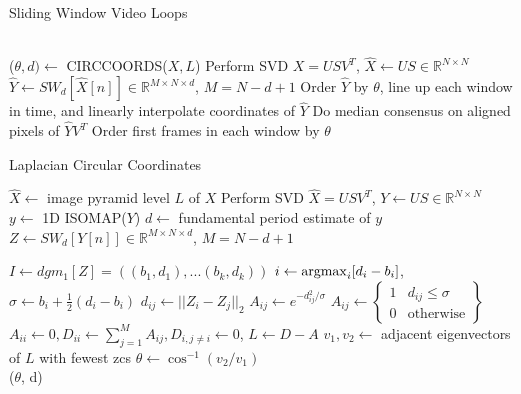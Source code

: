 \documentclass{article}
\newcommand{\argmax}{\operatornamewithlimits{argmax}}
\begin{document}
\begin{algorithm}[t]
  \caption{Sliding Window Video Loops}\label{alg:videoreordering}
  \begin{algorithmic}[1]
     \\
    \State ($\theta, d) \gets$ CIRCCOORDS($X, L$)
    \State Perform SVD $X = USV^T$, $\hat{X} \gets US \in \mathbb{R}^{N \times N}$
    \State $\hat{Y} \gets SW_d[\hat{X}[n]] \in \mathbb{R}^{M \times N \times d}$, $M = N-d+1$
        \State Order $\hat{Y}$ by $\theta$, line up each window in time, and linearly interpolate coordinates of $\hat{Y}$
        \State Do median consensus on aligned pixels of $\hat{Y}V^T$ \label{algline:medianconsensus}
    \Else
        \State Order first frames in each window by $\theta$
    \EndIf
    \EndProcedure
  \end{algorithmic}
\end{algorithm}


\begin{algorithm}[t]
    \caption{Laplacian Circular Coordinates}
    \begin{algorithmic}[1]
    \State $\hat{X} \gets $ image pyramid level $L$ of $X$
    \State Perform SVD $\hat{X} = USV^T$, $Y \gets US \in \mathbb{R}^{N \times N}$
    \State $y \gets$ 1D ISOMAP($Y$) \cite{tenenbaum2000global}
    \State $d \gets$ fundamental period estimate of $y$ \cite{Mcleod05asmarter}
    \State $Z \gets SW_{d}[Y[n]] \in \mathbb{R}^{M \times N \times d}$, $M = N-d+1$

    \State $I \gets dgm_1[Z] = ((b_1, d_1), ... (b_k, d_k))$
    \State $i \gets \argmax_{i}[d_i - b_i]$, $\sigma \gets b_i + \frac{1}{2}(d_i - b_i)$
    \State $d_{ij} \gets ||Z_i - Z_j||_2$
        \State $A_{ij} \gets e^{-d_{ij}^2/\sigma}$
    \Else
        \State $A_{ij} \gets \left\{ \begin{array}{cc} 1 & d_{ij} \leq \sigma \\ 0 & \text{otherwise} \end{array} \right\}$
    \EndIf
    \State $A_{ii} \gets 0, D_{ii} \gets \sum_{j=1}^M A_{ij}, D_{i, j \neq i} \gets 0$, $L \gets D - A$
    \State $v_1, v_2 \gets $ adjacent eigenvectors of $L$ with fewest zcs
    \State $\theta \gets \cos^{-1}(v_2/v_1)$\\
    \Return ($\theta$, d)
    \EndProcedure
  \end{algorithmic}
\end{algorithm}
\end{document}
